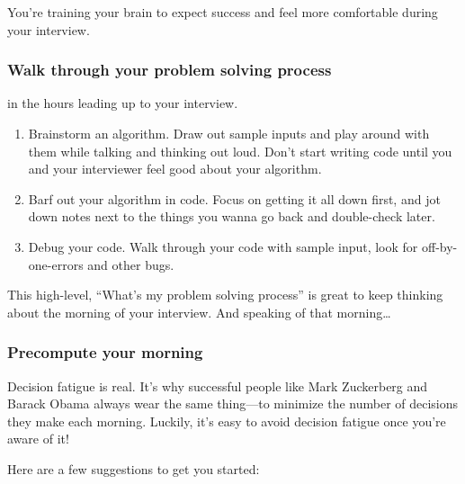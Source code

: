 \documentclass{article}
\begin{document}
 You're training your brain to expect success and feel more comfortable during your interview.



\subsubsection{Walk through your problem solving process}

 in the hours leading up to your interview. 

\begin{enumerate}
\item Brainstorm an algorithm. Draw out sample inputs and play around with them while talking and thinking out loud. Don't start writing code until you and your interviewer feel good about your algorithm.
\item Barf out your algorithm in code. Focus on getting it all down first, and jot down notes next to the things you wanna go back and double-check later.
\item Debug your code. Walk through your code with sample input, look for off-by-one-errors and other bugs.
\end{enumerate}



This high-level, “What's my problem solving process” is great to keep thinking about the morning of your interview. And speaking of that morning…




\subsubsection{Precompute your morning}
Decision fatigue is real. It's why successful people like Mark Zuckerberg and Barack Obama always wear the same thing—to minimize the number of decisions they make each morning. Luckily, it's easy to avoid decision fatigue once you're aware of it!

 Here are a few suggestions to get you started:
\end{document}
